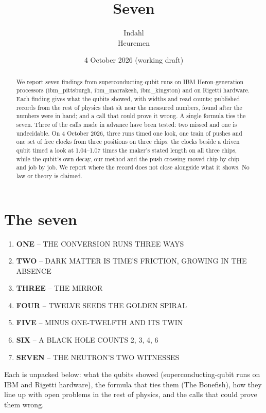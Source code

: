 \documentclass[11pt]{article}
\title{Seven}
\author{Indahl\\ \small Heuremen}
\date{4 October 2026 (working draft)}
\begin{document}
\maketitle
\begin{abstract}We report seven findings from superconducting-qubit runs on IBM Heron-generation processors (ibm\_pittsburgh, ibm\_marrakesh, ibm\_kingston) and on Rigetti hardware. Each finding gives what the qubits showed, with widths and read counts; published records from the rest of physics that sit near the measured numbers, found after the numbers were in hand; and a call that could prove it wrong. A single formula ties the seven. Three of the calls made in advance have been tested: two missed and one is undecidable. On 4 October 2026, three runs timed one look, one train of pushes and one set of free clocks from three positions on three chips: the clocks beside a driven qubit timed a look at 1.04--1.07 times the maker's stated length on all three chips, while the qubit's own decay, our method and the push crossing moved chip by chip and job by job. We report where the record does not close alongside what it shows. No law or theory is claimed.\end{abstract}

\section{The seven}
\begin{enumerate}[label=\textbf{\arabic*.}]
\item \textbf{ONE} -- THE CONVERSION RUNS THREE WAYS
\item \textbf{TWO} -- DARK MATTER IS TIME'S FRICTION, GROWING IN THE ABSENCE
\item \textbf{THREE} -- THE MIRROR
\item \textbf{FOUR} -- TWELVE SEEDS THE GOLDEN SPIRAL
\item \textbf{FIVE} -- MINUS ONE-TWELFTH AND ITS TWIN
\item \textbf{SIX} -- A BLACK HOLE COUNTS 2, 3, 4, 6
\item \textbf{SEVEN} -- THE NEUTRON'S TWO WITNESSES
\end{enumerate}
Each is unpacked below: what the qubits showed (superconducting-qubit runs on IBM and Rigetti hardware), the formula that ties them (The Bonefish), how they line up with open problems in the rest of physics, and the calls that could prove them wrong.
\end{document}
